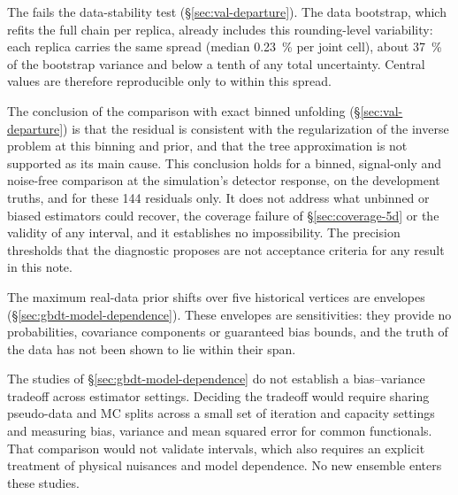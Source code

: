 The \estMultiD{} fails the data-stability test (\S\ref{sec:val-departure}). The data bootstrap, which refits the full chain per replica, already includes this rounding-level variability: each replica carries the same spread (median \SI{0.23}{\percent} per joint cell), about \SI{37}{\percent} of the bootstrap variance and below a tenth of any total uncertainty. Central values are therefore reproducible only to within this spread.

The conclusion of the comparison with exact binned unfolding (\S\ref{sec:val-departure}) is that the residual is consistent with the regularization of the inverse problem at this binning and prior, and that the tree approximation is not supported as its main cause. This conclusion holds for a binned, signal-only and noise-free comparison at the simulation's detector response, on the development truths, and for these 144 residuals only. It does not address what unbinned or biased estimators could recover, the coverage failure of \S\ref{sec:coverage-5d} or the validity of any interval, and it establishes no impossibility. The precision thresholds that the diagnostic proposes are not acceptance criteria for any result in this note.

The maximum real-data prior shifts over five historical vertices are envelopes (\S\ref{sec:gbdt-model-dependence}). These envelopes are sensitivities: they provide no probabilities, covariance components or guaranteed bias bounds, and the truth of the data has not been shown to lie within their span.

The studies of \S\ref{sec:gbdt-model-dependence} do not establish a bias--variance tradeoff across estimator settings. Deciding the tradeoff would require sharing pseudo-data and MC splits across a small set of iteration and capacity settings and measuring bias, variance and mean squared error for common functionals. That comparison would not validate intervals, which also requires an explicit treatment of physical nuisances and model dependence. No new ensemble enters these studies.

